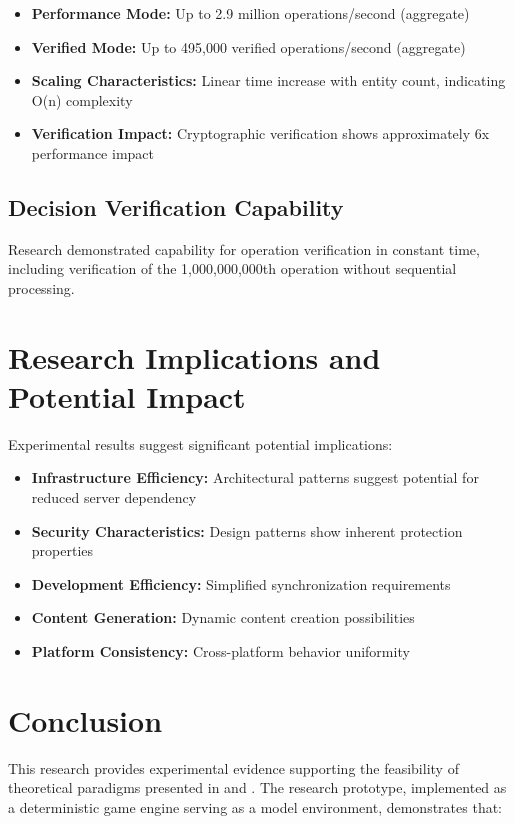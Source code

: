 \documentclass[14pt, a4paper]{extarticle}
\begin{document}
\begin{itemize}
    \item \textbf{Performance Mode:} Up to 2.9 million operations/second (aggregate)
    \item \textbf{Verified Mode:} Up to 495,000 verified operations/second (aggregate)
    \item \textbf{Scaling Characteristics:} Linear time increase with entity count, indicating O(n) complexity
    \item \textbf{Verification Impact:} Cryptographic verification shows approximately 6x performance impact
\end{itemize}

\subsection{Decision Verification Capability}
Research demonstrated capability for operation verification in constant time, including verification of the 1,000,000,000th operation without sequential processing.

\section{Research Implications and Potential Impact}

Experimental results suggest significant potential implications:
\begin{itemize}
    \item \textbf{Infrastructure Efficiency:} Architectural patterns suggest potential for reduced server dependency
    \item \textbf{Security Characteristics:} Design patterns show inherent protection properties
    \item \textbf{Development Efficiency:} Simplified synchronization requirements
    \item \textbf{Content Generation:} Dynamic content creation possibilities
    \item \textbf{Platform Consistency:} Cross-platform behavior uniformity
\end{itemize}

\section{Conclusion}

This research provides experimental evidence supporting the feasibility of theoretical paradigms presented in \cite{suvorov2025pointer} and \cite{suvorov2025local}. The research prototype, implemented as a deterministic game engine serving as a model environment, demonstrates that:
\end{document}
